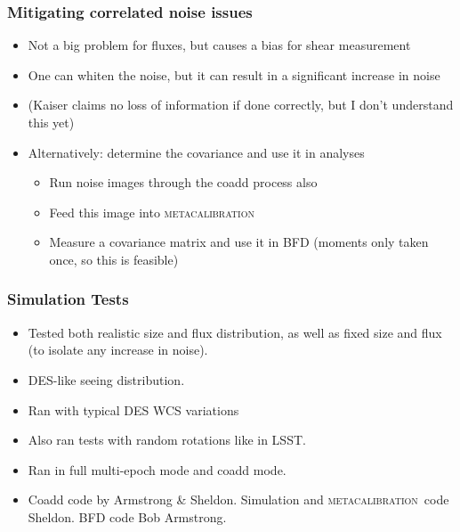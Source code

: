\documentclass{beamer}
\newcommand{\mcal}{\textsc{metacalibration}}
\begin{document}
\frame
{
    \frametitle{Mitigating correlated noise issues}

 
    \begin{itemize}

        \item Not a big problem for fluxes, but causes a bias for shear measurement

        \item One can whiten the noise, but it can result in a significant increase in noise

        \item (Kaiser claims no loss of information if done correctly, but I don't understand this yet)

        \item Alternatively: determine the covariance and use it in analyses
            \begin{itemize}
                \item Run noise images through the coadd process also
                \item Feed this image into \mcal
                \item Measure a covariance matrix and use it in BFD (moments only taken once, so this is feasible)
            \end{itemize}


    \end{itemize}

}

\frame
{
    \frametitle{Simulation Tests}

 
    \begin{itemize}

        \item Tested both realistic size and flux distribution, as well as
            fixed size and flux (to isolate any increase in noise).

        \item DES-like seeing distribution.

        \item Ran with typical DES WCS variations
        \item Also ran tests with random rotations like in LSST.

        \item Ran in full multi-epoch mode and coadd mode.

        \item Coadd code by Armstrong \& Sheldon.  Simulation and \mcal\ code
            Sheldon.  BFD code Bob Armstrong.

    \end{itemize}

}
\end{document}
